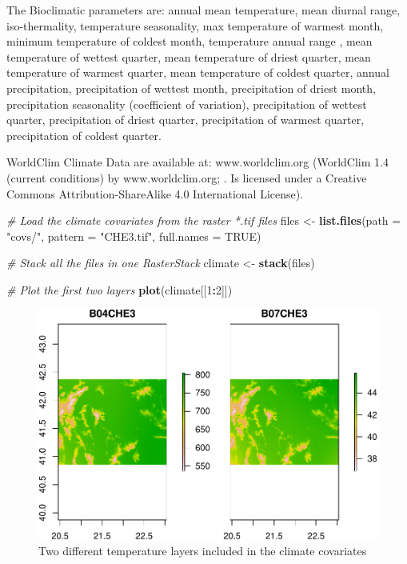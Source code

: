 \documentclass[10pt,b5paper,]{book}
\newenvironment{Shaded}{\begin{snugshade}}{\end{snugshade}}
\newcommand{\CommentTok}[1]{\textcolor[rgb]{0.56,0.35,0.01}{\textit{#1}}}
\newcommand{\DataTypeTok}[1]{\textcolor[rgb]{0.13,0.29,0.53}{#1}}
\newcommand{\DecValTok}[1]{\textcolor[rgb]{0.00,0.00,0.81}{#1}}
\newcommand{\KeywordTok}[1]{\textcolor[rgb]{0.13,0.29,0.53}{\textbf{#1}}}
\newcommand{\NormalTok}[1]{#1}
\newcommand{\OperatorTok}[1]{\textcolor[rgb]{0.81,0.36,0.00}{\textbf{#1}}}
\newcommand{\OtherTok}[1]{\textcolor[rgb]{0.56,0.35,0.01}{#1}}
\newcommand{\StringTok}[1]{\textcolor[rgb]{0.31,0.60,0.02}{#1}}
\theoremstyle{definition}
\theoremstyle{definition}
\theoremstyle{definition}
\theoremstyle{remark}
\begin{document}
The Bioclimatic parameters are: annual mean temperature, mean diurnal
range, iso-thermality, temperature seasonality, max temperature of
warmest month, minimum temperature of coldest month, temperature annual
range , mean temperature of wettest quarter, mean temperature of driest
quarter, mean temperature of warmest quarter, mean temperature of
coldest quarter, annual precipitation, precipitation of wettest month,
precipitation of driest month, precipitation seasonality (coefficient of
variation), precipitation of wettest quarter, precipitation of driest
quarter, precipitation of warmest quarter, precipitation of coldest
quarter.

WorldClim Climate Data are available at: www.worldclim.org (WorldClim
1.4 (current conditions) by www.worldclim.org; \citet{hijmans2005very}.
Is licensed under a Creative Commons Attribution-ShareAlike 4.0
International License).

\begin{Shaded}
\begin{Highlighting}[]
\CommentTok{# Load the climate covariates from the raster *.tif files}
\NormalTok{files <-}\StringTok{ }\KeywordTok{list.files}\NormalTok{(}\DataTypeTok{path =} \StringTok{"covs/"}\NormalTok{, }\DataTypeTok{pattern =} \StringTok{"CHE3.tif"}\NormalTok{, }
                    \DataTypeTok{full.names =} \OtherTok{TRUE}\NormalTok{)}

\CommentTok{# Stack all the files in one RasterStack}
\NormalTok{climate <-}\StringTok{ }\KeywordTok{stack}\NormalTok{(files)}
\end{Highlighting}
\end{Shaded}

\begin{Shaded}
\begin{Highlighting}[]
\CommentTok{# Plot the first two layers}
\KeywordTok{plot}\NormalTok{(climate[[}\DecValTok{1}\OperatorTok{:}\DecValTok{2}\NormalTok{]])}
\end{Highlighting}
\end{Shaded}

\begin{figure}
\centering
\includegraphics{SOCMapping_files/figure-latex/unnamed-chunk-23-1.pdf}
\caption{\label{fig:unnamed-chunk-23}Two different temperature layers
included in the climate covariates}
\end{figure}
\end{document}
